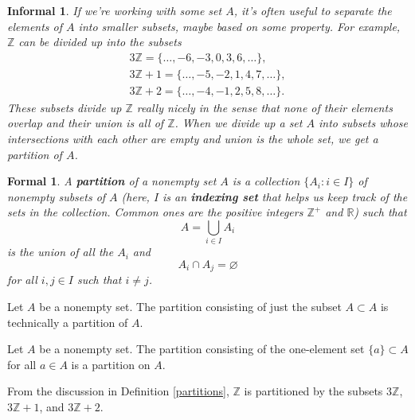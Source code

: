 \documentclass{amsart}
\newtheorem*{formal}{Formal}
\newtheorem*{informal}{Informal}
\begin{document}
\begin{definition}\label{partitions}
  \begin{informal}
     If we're working with some set \(A\), it's often useful to separate the
	  elements of \(A\) into smaller subsets, maybe based on some property. For
	  example, \(\mathbb{Z}\) can be divided up into the subsets 
	  \begin{align*}
	     3\mathbb{Z} = \{\ldots, -6, -3, 0, 3, 6, \ldots\},\\
		  3\mathbb{Z} + 1 = \{\ldots, -5, -2, 1, 4, 7, \ldots\},\\
		  3\mathbb{Z} + 2 = \{\ldots, -4, -1, 2, 5, 8, \ldots\}.
	  \end{align*}
	  These subsets divide up \(\mathbb{Z}\) really nicely in the
	  sense that none of their elements overlap and their union is all of
	  \(\mathbb{Z}\). When we divide up a set \(A\) into subsets whose
	  intersections with each other are empty and union is the whole set, we get
	  a \emph{partition} of \(A\).
  \end{informal}
  \begin{formal}
     A \textbf{partition} of a nonempty set \(A\) is a collection \(\{A_i: i\in
	  I\}\) of
	  nonempty subsets of \(A\) (here, \(I\) is an \textbf{indexing set} that
	  helps us keep track of the sets in the collection. Common ones are
	  the positive integers \(\mathbb{Z}^+\) and \(\mathbb{R}\)) such that 
	  \[
		  A = \bigcup_{i\in I}A_i
	  \]
	  is the union of all the \(A_i\) and 
	  \[
	     A_i\cap A_j = \varnothing
	  \]
	  for all \(i, j\in I\) such that \(i\ne j\).
  \end{formal}
\end{definition}

\begin{example}\label{trivpart}
   Let \(A\) be a nonempty set. The partition consisting of just the subset
	\(A\subset A\) is technically a partition of \(A\).
\end{example}

\begin{example}\label{discpart}
	Let \(A\) be a nonempty set. The partition consisting of the one-element set
	\(\{a\}\subset A\) for all \(a\in A\) is a partition on \(A\).
\end{example}

\begin{example}\label{mod3part}
	From the discussion in Definition \ref{partitions}, \(\mathbb{Z}\) is
	partitioned by the subsets \(3\mathbb{Z}\), \(3\mathbb{Z} + 1\), and
	\(3\mathbb{Z} + 2\).
\end{example}
\end{document}
